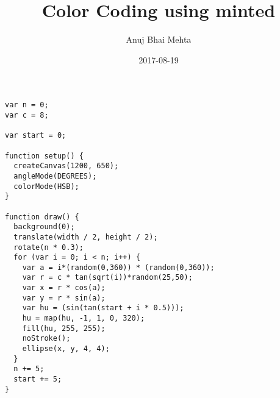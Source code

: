 \documentclass{article}
\title{Color Coding using minted}
\date{2017-08-19}
\author{Anuj Bhai Mehta}
\begin{document}
\maketitle

\begin{verbatim}
var n = 0;
var c = 8;

var start = 0;

function setup() {
  createCanvas(1200, 650);
  angleMode(DEGREES);
  colorMode(HSB);
}

function draw() {
  background(0);
  translate(width / 2, height / 2);
  rotate(n * 0.3);
  for (var i = 0; i < n; i++) {
    var a = i*(random(0,360)) * (random(0,360));
    var r = c * tan(sqrt(i))*random(25,50);
    var x = r * cos(a);
    var y = r * sin(a);
    var hu = (sin(tan(start + i * 0.5)));
    hu = map(hu, -1, 1, 0, 320);
    fill(hu, 255, 255);
    noStroke();
    ellipse(x, y, 4, 4);
  }
  n += 5;
  start += 5;
}
\end{verbatim}
\end{document}
